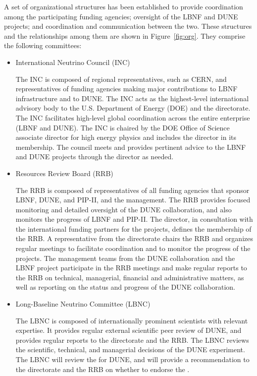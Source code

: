A set  of  organizational structures  has been established  to  provide
coordination  among  the  participating  funding agencies;
oversight of the LBNF and DUNE projects;
and coordination and communication between the 
two. These structures and the relationships among them are shown 
in Figure~\ref{fig:org}. They comprise the following committees:
\begin{itemize}
\item International Neutrino Council (INC)

The INC is composed of regional representatives, such as CERN, and representatives of funding agencies making major contributions to LBNF infrastructure and to DUNE. The INC acts as the highest-level international advisory body to the U.S. Department of Energy (DOE) and the \fnal directorate. The INC facilitates high-level global coordination across the entire enterprise (LBNF and DUNE). The INC is chaired by the DOE Office of Science associate director for high energy physics and includes the \fnal director in its membership. The council meets and provides pertinent advice to the LBNF and DUNE projects through the \fnal director as needed.
\item Resources Review Board (RRB)

The RRB is composed of representatives of all funding agencies that sponsor LBNF, DUNE, and PIP-II, and the \fnal management. The RRB provides focused monitoring and detailed oversight of the DUNE collaboration, and also monitors the progress of LBNF and PIP-II. The \fnal director,  in consultation with the international funding partners for the projects, defines the membership of the RRB. A representative from the \fnal directorate chairs the RRB and organizes regular meetings to facilitate coordination and to monitor the progress of the projects. The management teams from the DUNE collaboration and the LBNF project participate in the RRB meetings and make regular reports to the RRB on technical, managerial, financial and administrative matters, as well as reporting on the status and progress of the DUNE collaboration.

\item Long-Baseline Neutrino Committee (LBNC)

The LBNC is composed of internationally prominent scientists with relevant expertise. It provides regular external scientific peer review of DUNE, and provides regular reports to the \fnal  directorate and the RRB. The LBNC reviews the scientific, technical, and managerial decisions of the DUNE experiment. The LBNC will review the  for DUNE, and will provide a recommendation to the \fnal directorate and the RRB on whether to endorse the .


\end{itemize}
